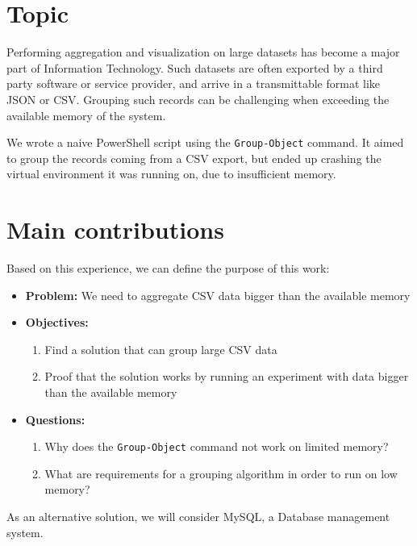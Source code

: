 \documentclass[12pt,letterpaper]{article} %
\begin{document}



\newpage
\tableofcontents
\newpage


\section{Topic}

Performing aggregation and visualization on large datasets has become a major part of Information Technology.
Such datasets are often exported by a third party software or service provider, and arrive in a transmittable
format like JSON or CSV. Grouping such records can be challenging when exceeding the available
memory of the system.

We wrote a naive PowerShell script using the \verb+Group-Object+ command.
It aimed to group the records coming from a CSV export, but ended up
crashing the virtual environment it was running on, due to insufficient memory.

\section{Main contributions} \label{Main contributions}
Based on this experience, we can define the purpose of this work:
\begin{itemize}
    \item \textbf{Problem:} We need to aggregate CSV data bigger than the available memory
    \item \textbf{Objectives:}
    \begin{enumerate}
        \item Find a solution that can group large CSV data
        \item Proof that the solution works by running an
            experiment with data bigger than the available memory
    \end{enumerate}
    \item \textbf{Questions:}
    \begin{enumerate}
        \item Why does the \verb+Group-Object+ command not work on limited memory?
        \item What are requirements for a grouping algorithm in order to run on low memory?
    \end{enumerate}
\end{itemize}
As an alternative solution, we will consider MySQL, a Database management system.
\end{document}
